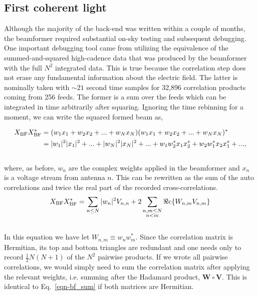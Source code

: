 \subsection{First coherent light}
Although the majority of the back-end was written within a couple  
of months, the beamformer required substantial 
on-sky testing and subsequent debugging. One important debugging tool 
came from utilizing the equivalence of the summed-and-squared
high-cadence data that was produced by the beamformer with the 
full $N^2$ integrated data. This is true because the correlation 
step does not erase any fundamental information about the electric field. 
The latter is nominally taken with $\sim21$ second
time samples for 32,896 correlation products coming from 256 feeds. 
The former is a sum over the feeds which can be integrated in time 
arbitrarily after squaring. Ignoring the time rebinning for a moment,
we can write the squared formed beam as,

\begin{align}
X_{\rm BF} X_{\rm BF}^* &= (w_1 x_1 + w_2 x_2 + ... + w_N x_N) (w_1 x_1 + w_2 x_2 + ... + w_N x_N)^*\\
&= |w_1|^2|x_1|^2 + ... + |w_N|^2|x_N|^2 + ... + w_1 w_2^* x_1 x_2^* + w_2 w_1^* x_2 x_1^* + ... , 
\end{align}
\\

\noindent where, as before, $w_n$ are the 
complex weights applied in the beamformer 
and $x_n$ is a voltage stream from antenna $n$.
This can be rewritten as the sum of the 
auto correlations and twice the real part of the recorded cross-correlations.
\\

\begin{equation}
\label{eqn-bf_sum}
X_{\rm BF} X_{\rm BF}^* = \sum_{n\le N} |w_n|^2 V_{n, n} + 
2 \sum_{\substack{n,m\le N \\ n<m}} \Re e\{W_{n, m} V_{n, m}\}
\end{equation}
\\

In this equation we have let $W_{n, m} \equiv w_n w_m^*$.
Since the correlation matrix is Hermitian, its top 
and bottom triangles are redundant and one needs only to 
record $\frac{1}{2} N (N+1)$ of the $N^2$ pairwise products.
If we wrote all pairwise correlations, we would simply need 
to sum the correlation matrix after applying the relevant 
weights, i.e. summing after the Hadamard
product, $\mathbf{W} \circ \mathbf{V}$. This is identical 
to Eq.~\ref{eqn-bf_sum} if both matrices are Hermitian. 

